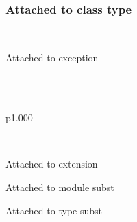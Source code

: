 \label{Labels--class-c}\\
\label{Labels--class-type-cs}\label{Labels-class-type-cs}\begin{ocamlindent}\subsubsection{Attached to class type\label{Labels-class-type-cs--L8}}%
\end{ocamlindent}%
\\
\label{Labels--exception-E}\begin{ocamlindent}Attached to exception\end{ocamlindent}%
\medbreak
\label{Labels--type-x}\\
\label{Labels--extension-decl-X}\\
\begin{ocamltabular}{p{1.000\textwidth}}\label{Labels--extension-X}\\
\end{ocamltabular}%
\\
\begin{ocamlindent}Attached to extension\end{ocamlindent}%
\medbreak
\label{Labels--module-subst-S}\begin{ocamlindent}Attached to module subst\end{ocamlindent}%
\medbreak
\label{Labels--type-subst-s}\begin{ocamlindent}Attached to type subst\end{ocamlindent}%
\medbreak
\label{Labels--type-u}\\
